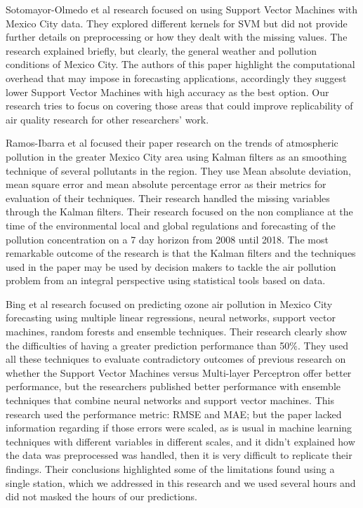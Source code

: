 \documentclass{llncs}
\begin{document}
Sotomayor-Olmedo et al \cite{sotomayor} research focused on using Support Vector Machines
with Mexico City data. They explored different kernels for SVM but did
not provide further details on preprocessing or how they dealt with the
missing values. The research explained briefly, but clearly, the general
weather and pollution conditions of Mexico City. The authors of this
paper highlight the computational overhead that may impose in
forecasting applications, accordingly they suggest lower Support Vector
Machines with high accuracy as the best option. Our research tries to
focus on covering those areas that could improve replicability of air
quality research for other researchers' work.

Ramos-Ibarra et al \cite{ramosibarra} focused their paper research on the trends of
atmospheric pollution in the greater Mexico City area using Kalman
filters as an smoothing technique of several pollutants in the region.
They use Mean absolute deviation, mean square error and mean absolute
percentage error as their metrics for evaluation of their techniques.
Their research handled the missing variables through the Kalman
filters. Their research focused on the non compliance at the time of the
environmental local and global regulations and forecasting of the
pollution concentration on a 7 day horizon from 2008 until 2018. The
most remarkable outcome of the research is that the Kalman filters and
the techniques used in the paper may be used by decision makers to
tackle the air pollution problem from an integral perspective using
statistical tools based on data.

Bing et al \cite{bing} research focused on predicting ozone air pollution in Mexico
City forecasting using multiple linear regressions, neural networks,
support vector machines, random forests and ensemble techniques. Their
research clearly show the difficulties of having a greater prediction
performance than 50\%. They used all these techniques to evaluate
contradictory outcomes of previous research on whether the Support
Vector Machines versus Multi-layer Perceptron offer better performance,
but the researchers published better performance with ensemble
techniques that combine neural networks and support vector machines.
This research used the performance metric: RMSE and MAE; but the paper
lacked information regarding if those errors were scaled, as is usual in
machine learning techniques with different variables in different
scales, and it didn't explained how the data was preprocessed was
handled, then it is very difficult to replicate their findings. Their
conclusions highlighted some of the limitations found using a single
station, which we addressed in this research and we used several hours
and did not masked the hours of our predictions.
\end{document}
